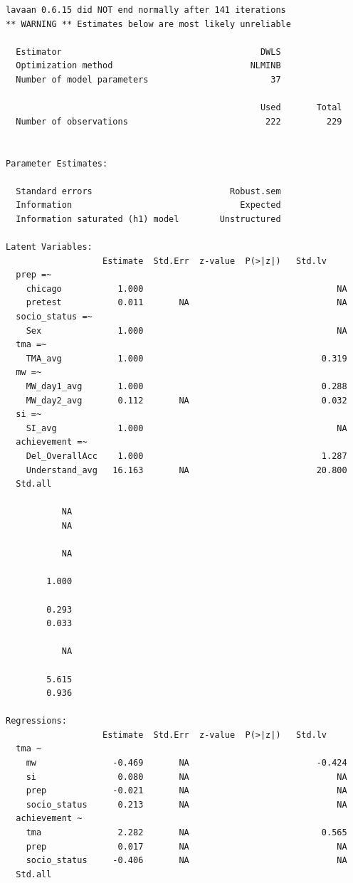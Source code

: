 \documentclass[
  letterpaper,
  DIV=11,
  numbers=noendperiod]{scrartcl}
\begin{document}
\begin{verbatim}
lavaan 0.6.15 did NOT end normally after 141 iterations
** WARNING ** Estimates below are most likely unreliable

  Estimator                                       DWLS
  Optimization method                           NLMINB
  Number of model parameters                        37

                                                  Used       Total
  Number of observations                           222         229


Parameter Estimates:

  Standard errors                           Robust.sem
  Information                                 Expected
  Information saturated (h1) model        Unstructured

Latent Variables:
                   Estimate  Std.Err  z-value  P(>|z|)   Std.lv    
  prep =~                                                          
    chicago           1.000                                      NA
    pretest           0.011       NA                             NA
  socio_status =~                                                  
    Sex               1.000                                      NA
  tma =~                                                           
    TMA_avg           1.000                                   0.319
  mw =~                                                            
    MW_day1_avg       1.000                                   0.288
    MW_day2_avg       0.112       NA                          0.032
  si =~                                                            
    SI_avg            1.000                                      NA
  achievement =~                                                   
    Del_OverallAcc    1.000                                   1.287
    Understand_avg   16.163       NA                         20.800
  Std.all    
             
           NA
           NA
             
           NA
             
        1.000
             
        0.293
        0.033
             
           NA
             
        5.615
        0.936

Regressions:
                   Estimate  Std.Err  z-value  P(>|z|)   Std.lv    
  tma ~                                                            
    mw               -0.469       NA                         -0.424
    si                0.080       NA                             NA
    prep             -0.021       NA                             NA
    socio_status      0.213       NA                             NA
  achievement ~                                                    
    tma               2.282       NA                          0.565
    prep              0.017       NA                             NA
    socio_status     -0.406       NA                             NA
  Std.all    
             

\end{verbatim}
\end{document}
